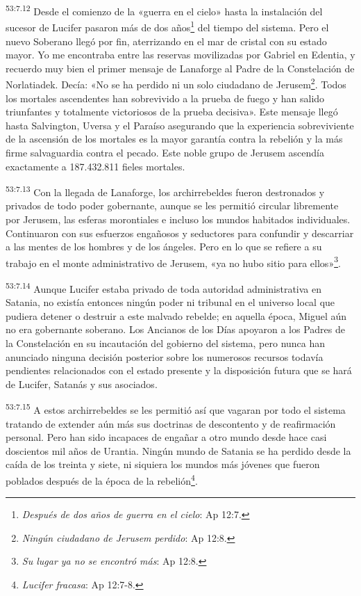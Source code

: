 \par
\textsuperscript{53:7.12} Desde el comienzo de la «guerra en el cielo» hasta la instalación del sucesor de Lucifer pasaron más de dos años\footnote{\textit{Después de dos años de guerra en el cielo}: Ap 12:7.} del tiempo del sistema. Pero el nuevo Soberano llegó por fin, aterrizando en el mar de cristal con su estado mayor. Yo me encontraba entre las reservas movilizadas por Gabriel en Edentia, y recuerdo muy bien el primer mensaje de Lanaforge al Padre de la Constelación de Norlatiadek. Decía: «No se ha perdido ni un solo ciudadano de Jerusem\footnote{\textit{Ningún ciudadano de Jerusem perdido}: Ap 12:8.}. Todos los mortales ascendentes han sobrevivido a la prueba de fuego y han salido triunfantes y totalmente victoriosos de la prueba decisiva». Este mensaje llegó hasta Salvington, Uversa y el Paraíso asegurando que la experiencia sobreviviente de la ascensión de los mortales es la mayor garantía contra la rebelión y la más firme salvaguardia contra el pecado. Este noble grupo de Jerusem ascendía exactamente a 187.432.811 fieles mortales.

\par
\textsuperscript{53:7.13} Con la llegada de Lanaforge, los archirrebeldes fueron destronados y privados de todo poder gobernante, aunque se les permitió circular libremente por Jerusem, las esferas morontiales e incluso los mundos habitados individuales. Continuaron con sus esfuerzos engañosos y seductores para confundir y descarriar a las mentes de los hombres y de los ángeles. Pero en lo que se refiere a su trabajo en el monte administrativo de Jerusem, «ya no hubo sitio para ellos»\footnote{\textit{Su lugar ya no se encontró más}: Ap 12:8.}.

\par
\textsuperscript{53:7.14} Aunque Lucifer estaba privado de toda autoridad administrativa en Satania, no existía entonces ningún poder ni tribunal en el universo local que pudiera detener o destruir a este malvado rebelde; en aquella época, Miguel aún no era gobernante soberano. Los Ancianos de los Días apoyaron a los Padres de la Constelación en su incautación del gobierno del sistema, pero nunca han anunciado ninguna decisión posterior sobre los numerosos recursos todavía pendientes relacionados con el estado presente y la disposición futura que se hará de Lucifer, Satanás y sus asociados.

\par
\textsuperscript{53:7.15} A estos archirrebeldes se les permitió así que vagaran por todo el sistema tratando de extender aún más sus doctrinas de descontento y de reafirmación personal. Pero han sido incapaces de engañar a otro mundo desde hace casi doscientos mil años de Urantia. Ningún mundo de Satania se ha perdido desde la caída de los treinta y siete, ni siquiera los mundos más jóvenes que fueron poblados después de la época de la rebelión\footnote{\textit{Lucifer fracasa}: Ap 12:7-8.}.

